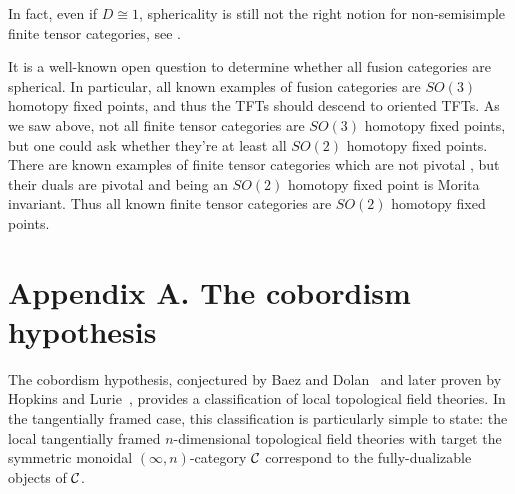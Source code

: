 \documentclass{amsart}
\begin{document}
In fact, even if $D \cong 1$, sphericality is still not the right notion for non-semisimple finite tensor categories, see \cite[Rem. 7.5]{MR2097289}.

\begin{remark}
It is a well-known open question to determine whether all fusion categories are spherical.  In particular, all known examples of fusion categories are $SO(3)$ homotopy fixed points, and thus the TFTs should descend to oriented TFTs.  As we saw above, not all finite tensor categories are $SO(3)$ homotopy fixed points, but one could ask whether they're at least all $SO(2)$ homotopy fixed points.  There are known examples of finite tensor categories which are not pivotal \cite[Rem. 2.11]{1204.5807}, but their duals are pivotal and being an $SO(2)$ homotopy fixed point is Morita invariant.  Thus all known finite tensor categories are $SO(2)$ homotopy fixed points.
\end{remark}


\renewcommand{\theapptheorem}{A.\arabic{apptheorem}}
\setcounter{apptheorem}{0}


\nopagebreak
{}
\section*{Appendix A. The cobordism hypothesis} \label{app:ch}


The cobordism hypothesis, conjectured by Baez and Dolan~\cite{MR1355899} and later proven by Hopkins and Lurie~\cite{lurie-ch}, provides a classification of local topological field theories.  In the tangentially framed case, this classification is particularly simple to state: the local tangentially framed $n$-dimensional topological field theories with target the symmetric monoidal $(\infty,n)$-category $\mathcal C$ correspond to the fully-dualizable objects of $\mathcal C$.  
\end{document}
